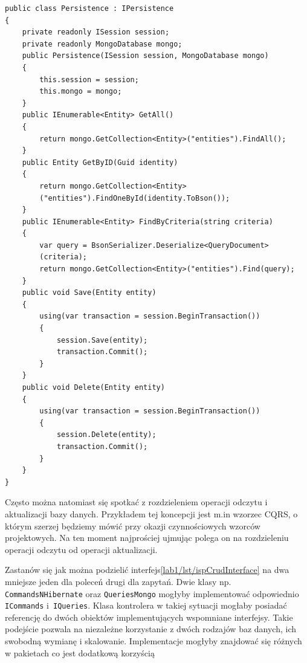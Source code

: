 \begin{lstlisting}[caption={Implementacja interfejsu \texttt{IPersistence}}, label={lab1/lst/ispCrudInterfaceImplementation}]
public class Persistence : IPersistence
{
	private readonly ISession session;
	private readonly MongoDatabase mongo;
	public Persistence(ISession session, MongoDatabase mongo)
	{
		this.session = session;
		this.mongo = mongo;
	}
	public IEnumerable<Entity> GetAll()
	{
		return mongo.GetCollection<Entity>("entities").FindAll();
	}
	public Entity GetByID(Guid identity)
	{
		return mongo.GetCollection<Entity>
		("entities").FindOneById(identity.ToBson());
	}
	public IEnumerable<Entity> FindByCriteria(string criteria)
	{
		var query = BsonSerializer.Deserialize<QueryDocument>
		(criteria);
		return mongo.GetCollection<Entity>("entities").Find(query);
	}
	public void Save(Entity entity)
	{
		using(var transaction = session.BeginTransaction())
		{
			session.Save(entity);
			transaction.Commit();
		}
	}
	public void Delete(Entity entity)
	{
		using(var transaction = session.BeginTransaction())
		{
			session.Delete(entity);
			transaction.Commit();
		}
	}
}
\end{lstlisting}
Często można natomiast się spotkać z rozdzieleniem operacji odczytu i aktualizacji bazy danych. Przykładem tej koncepcji jest m.in wzorzec CQRS, o którym szerzej będziemy mówić przy okazji czynnościowych wzorców projektowych. Na ten moment najprościej ujmując polega on na rozdzieleniu operacji odczytu od operacji aktualizacji. 

Zastanów się jak można podzielić interfejs\ref{lab1/lst/ispCrudInterface} na dwa mniejsze jeden dla poleceń drugi dla zapytań. Dwie klasy np. \texttt{CommandsNHibernate} oraz \texttt{QueriesMongo} mogłyby implementować odpowiednio \texttt{ICommands} i~\texttt{IQueries}. Klasa kontrolera w takiej sytuacji mogłaby posiadać referencję do dwóch obiektów implementujących wspomniane interfejsy. Takie podejście pozwala na niezależne korzystanie z dwóch rodzajów baz danych, ich swobodną wymianę i skalowanie. Implementacje mogłyby znajdować się różnych w pakietach co jest dodatkową korzyścią 

